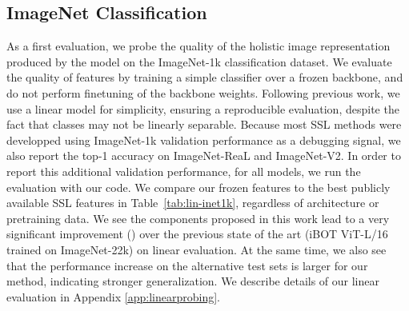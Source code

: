 \subsection{ImageNet Classification}
\label{sec:imagenet}
As a first evaluation, we probe the quality of the holistic image representation produced by the model on the ImageNet-1k classification dataset.
We evaluate the quality of features by training a simple classifier over a frozen backbone, and do not perform finetuning of the backbone weights.
Following previous work, we use a linear model for simplicity, ensuring a reproducible evaluation, despite the fact that classes may not be linearly separable.
Because most SSL methods were developped using ImageNet-1k validation performance as a debugging signal, we also report the top-1 accuracy on ImageNet-ReaL and ImageNet-V2.
In order to report this additional validation performance, for all models, we run the evaluation with our code.
We compare our frozen features to the best publicly available SSL features in Table~\ref{tab:lin-inet1k}, regardless of architecture or pretraining data. 
We see the components proposed in this work lead to a very significant improvement () over the previous state of the art (iBOT ViT-L/16 trained on ImageNet-22k) on linear evaluation.
At the same time, we also see that the performance increase on the alternative test sets is larger for our method, indicating stronger generalization. We describe details of our linear evaluation in Appendix \ref{app:linearprobing}.


